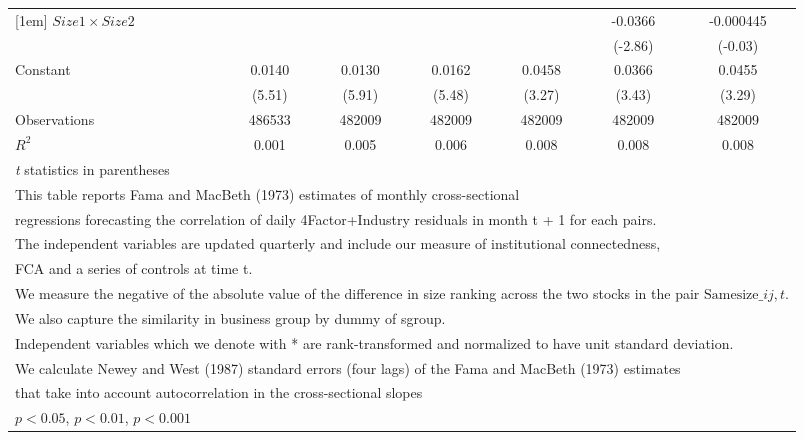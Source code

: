 {\begin{tabular}{l*{6}{c}}
[1em]
$ Size1 \times Size2 $&                     &                     &                     &                     &     -0.0366\sym{**} &   -0.000445         \\
                    &                     &                     &                     &                     &     (-2.86)         &     (-0.03)         \\
[1em]
Constant            &      0.0140\sym{***}&      0.0130\sym{***}&      0.0162\sym{***}&      0.0458\sym{**} &      0.0366\sym{**} &      0.0455\sym{**} \\
                    &      (5.51)         &      (5.91)         &      (5.48)         &      (3.27)         &      (3.43)         &      (3.29)         \\
\hline
Observations        &      486533         &      482009         &      482009         &      482009         &      482009         &      482009         \\
\(R^{2}\)           &       0.001         &       0.005         &       0.006         &       0.008         &       0.008         &       0.008         \\
\hline\hline
\multicolumn{7}{l}{\footnotesize \textit{t} statistics in parentheses}\\
\multicolumn{7}{l}{\footnotesize This table reports Fama and MacBeth (1973) estimates of monthly cross-sectional}\\
\multicolumn{7}{l}{\footnotesize  regressions forecasting the correlation of daily 4Factor+Industry residuals in month t + 1 for each pairs.}\\
\multicolumn{7}{l}{\footnotesize The independent variables are updated quarterly and include our measure of institutional connectedness,}\\
\multicolumn{7}{l}{\footnotesize  FCA and a series of controls at time t.}\\
\multicolumn{7}{l}{\footnotesize We measure the negative of the absolute value of the difference in size ranking across the two stocks in the pair $ \text{Samesize}\_{ij,t} $.}\\
\multicolumn{7}{l}{\footnotesize We also capture the similarity in business group by dummy of sgroup.}\\
\multicolumn{7}{l}{\footnotesize Independent variables which  we denote with * are rank-transformed and normalized to have unit standard deviation.}\\
\multicolumn{7}{l}{\footnotesize  We calculate Newey and West (1987) standard errors (four lags) of the Fama and MacBeth (1973) estimates }\\
\multicolumn{7}{l}{\footnotesize  that take into account autocorrelation in the cross-sectional slopes}\\
\multicolumn{7}{l}{\footnotesize \sym{*} \(p<0.05\), \sym{**} \(p<0.01\), \sym{***} \(p<0.001\)}\\
\end{tabular}
}
